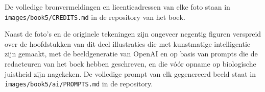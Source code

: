 De volledige bronvermeldingen en licentieadressen van elke foto staan
in \texttt{images/\allowbreak book5/\allowbreak CREDITS.md} in de repository van het boek.

\bigskip
Naast de foto's en de originele tekeningen zijn ongeveer negentig
figuren verspreid over de hoofdstukken van dit deel illustraties die
met kunstmatige intelligentie zijn gemaakt, met de beeldgeneratie van
OpenAI en op basis van prompts die de redacteuren van het boek hebben
geschreven, en die vóór opname op biologische juistheid zijn
nagekeken. De volledige prompt van elk gegenereerd beeld staat in
\texttt{images/\allowbreak book5/\allowbreak ai/\allowbreak PROMPTS.md} in de repository.
\par\endgroup
\clearpage
